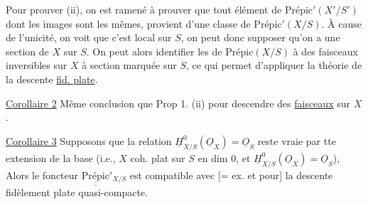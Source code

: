 Pour prouver (ii), on est ramené à prouver que tout élément de $\mathrm{Prépic}'(X'/S')$ dont les images sont les mêmes, provient d'une classe de $\mathrm{Prépic}'(X/S)$. À cause de l'unicité, on voit que c'est local sur $S$, on peut donc supposer qu'on a une section de $X$ sur $S$. On peut alors identifier les  de $\mathrm{Prépic}(X/S)$ à des faisceaux inversibles  sur $X$ à section marquée sur $S$, ce qui permet d'appliquer la théorie de la descente \uline{fid. plate}.

\uline{Corollaire 2} Même conclusion que Prop 1. (ii) pour descendre des \uline{faisceaux} sur $X$.

\uline{Corollaire 3} Supposons que la relation $\underline H^0_{X/S}(\underline O_X)=\underline O_S$ reste vraie par tte extension de la base (i.e., $X$ coh. plat sur $S$ en dim 0, et $\underline H^0_{X/S}(\underline O_X)=\underline O_S$),  Alors le foncteur $\underline{\underline{\mathrm{Prépic}}}'_{X/S}$ est compatible avec [= ex. et pour] la descente fidèlement plate quasi-compacte.

